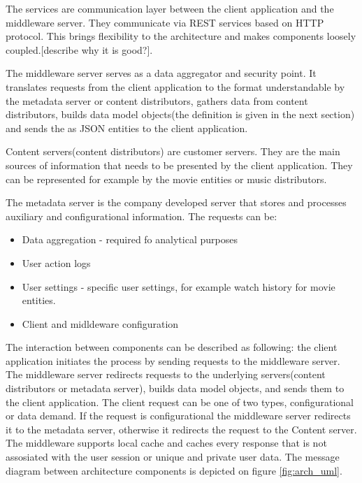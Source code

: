 The services are communication layer between the client application and the middleware server. They communicate via REST services based on HTTP protocol. This brings flexibility to the architecture and makes components loosely coupled.[describe why it is good?]. 

The middleware server serves as a data aggregator and security point. It translates requests from the client application to the format understandable by the metadata server or content distributors, gathers data from content distributors, builds data model objects(the definition is given in the next section) and sends the as JSON entities to the client application.

Content servers(content distributors) are customer servers. They are the main sources of information that needs to be presented by the client application. They can be represented for example by the movie entities or music distributors.

The metadata server is the company developed server that stores and processes auxiliary and configurational information. The requests can be: 

\begin{itemize}
	\item Data aggregation - required fo analytical purposes
	\item User action logs 
	\item User settings - specific user settings, for example watch history for movie entities.
	\item Client and midldeware configuration
\end{itemize} 

The interaction between components can be described as following: the client application initiates the process by  sending requests to the middleware server. The middleware server redirects requests to the underlying servers(content distributors or metadata server), builds data model objects, and sends them to the client application. The client request can be one of two types, configurational or data demand. If the request is configurational the middleware server redirects it to the metadata server, otherwise it redirects the request to the Content server. The middleware supports local cache and caches every response that is not assosiated with the user session or unique and private user data. The message diagram between architecture components is depicted on figure \ref{fig:arch_uml}.


